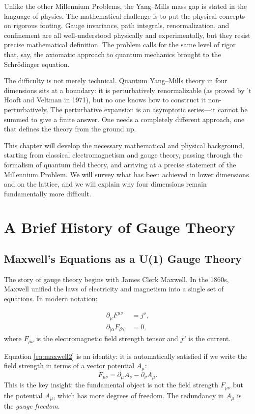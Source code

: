 Unlike the other Millennium Problems, the Yang--Mills mass gap is stated in the language of physics. The mathematical challenge is to put the physical concepts on rigorous footing. Gauge invariance, path integrals, renormalization, and confinement are all well-understood physically and experimentally, but they resist precise mathematical definition. The problem calls for the same level of rigor that, say, the axiomatic approach to quantum mechanics brought to the Schr\"{o}dinger equation.

The difficulty is not merely technical. Quantum Yang--Mills theory in four dimensions sits at a boundary: it is perturbatively renormalizable (as proved by 't Hooft and Veltman in 1971), but no one knows how to construct it non-perturbatively. The perturbative expansion is an asymptotic series---it cannot be summed to give a finite answer. One needs a completely different approach, one that defines the theory from the ground up.

This chapter will develop the necessary mathematical and physical background, starting from classical electromagnetism and gauge theory, passing through the formalism of quantum field theory, and arriving at a precise statement of the Millennium Problem. We will survey what has been achieved in lower dimensions and on the lattice, and we will explain why four dimensions remain fundamentally more difficult.

\section{A Brief History of Gauge Theory}

\subsection{Maxwell's Equations as a U(1) Gauge Theory}

The story of gauge theory begins with James Clerk Maxwell. In the 1860s, Maxwell unified the laws of electricity and magnetism into a single set of equations. In modern notation:

\begin{align}
\partial_\mu F^{\mu\nu} &= j^\nu, \label{eq:maxwell1} \\
\partial_{[\alpha} F_{\beta\gamma]} &= 0, \label{eq:maxwell2}
\end{align}
where $F_{\mu\nu}$ is the electromagnetic field strength tensor and $j^\nu$ is the current.

Equation \eqref{eq:maxwell2} is an identity: it is automatically satisfied if we write the field strength in terms of a vector potential $A_\mu$:
\[
F_{\mu\nu} = \partial_\mu A_\nu - \partial_\nu A_\mu.
\]
This is the key insight: the fundamental object is not the field strength $F_{\mu\nu}$ but the potential $A_\mu$, which has more degrees of freedom. The redundancy in $A_\mu$ is the \textit{gauge freedom}.

